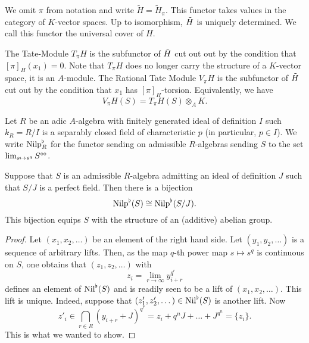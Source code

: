 \begin{defi}
  We omit $\pi$ from notation and write $\tilde H = \tilde H_\pi$. This functor
  takes values in the category of $K$-vector spaces.
  Up to isomorphism, $\Tilde H$ is uniquely determined. We call this functor
  the universal cover of $H$. 

  The Tate-Module $T_\pi H$ is the subfunctor of $\Tilde H$ cut out out
  by the condition that $[\pi]_H(x_1) = 0$. Note that $T_\pi H$ does no longer 
  carry the structure of a $K$-vector space, it is an $A$-module. The Rational
  Tate Module $V_\pi H$ is the subfunctor of $\Tilde H$ cut out by the
  condition that $x_1$ has $[\pi]_H$-torsion. Equivalently, we have 
  \begin{equation*}
    V_\pi H (S) = T_\pi H(S) \otimes_A K.
  \end{equation*}
\end{defi}

Let $R$ be an adic $A$-algebra with finitely generated ideal of definition $I$ such
$k_R = R/I$ is a separably closed field of characteristic $p$ (in particular, $p \in I$). 
We write ${\mathrm{Nilp}}^\flat_R$ for the functor sending on admissible $R$-algebras sending
$S$ to the set $\lim_{s \mapsto s^q} S^{\circ \hspace{-0.5pt} \circ}$. 

\begin{lem}
  Suppose that $S$ is an admissible $R$-algebra admitting an ideal of definition 
  $J$ such that $S/J$ is a perfect field. Then there is a bijection
  \begin{equation*}
    {\mathrm{Nilp}}^\flat(S) \cong {\mathrm{Nilp}}^\flat(S/J).
  \end{equation*}
  This bijection equips $S$ with the structure of an (additive) abelian group. 
  \begin{proof}[Proof]
    Let $(x_1, x_2, \dots)$ be an element of the right hand side. Let
    $(y_1, y_2, \dots)$ is a sequence of arbitrary lifts. Then, as the map 
    $q$-th power map $s \mapsto s^q$ is continuous on $S$, one obtains that 
    $(z_1, z_2, \dots)$ with 
    \begin{equation*}
      z_i = \lim_{r \to \infty} y_{i+r}^{q^r}
    \end{equation*}
    defines an element of ${\operatorname{Nil}}^\flat(S)$ and is readily seen to be a lift of 
    $(x_1, x_2, \dots)$. This lift is unique. Indeed, suppose that 
    $(z'_1, z'_2, \dots) \in {\operatorname{Nil}}^\flat(S)$ is another lift. Now 
    \begin{equation*}
      z'_i \in \bigcap_{r \in R}(y_{i+r} + J)^{q^r} = z_i + q^n J + \dots +
      J^{q^n} =  \{z_i\}.
    \end{equation*}
    This is what we wanted to show.
  \end{proof}
\end{lem}

